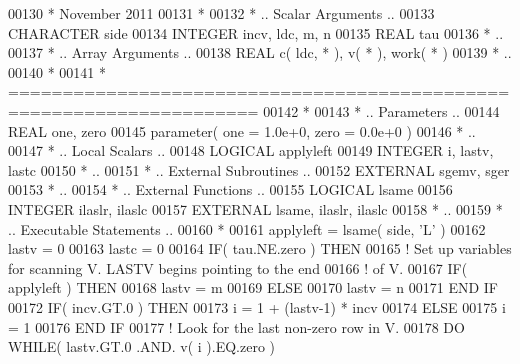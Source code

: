 \begin{DoxyCode}
00130 \textcolor{comment}{*     November 2011}
00131 \textcolor{comment}{*}
00132 \textcolor{comment}{*     .. Scalar Arguments ..}
00133       \textcolor{keywordtype}{CHARACTER}          side
00134       \textcolor{keywordtype}{INTEGER}            incv, ldc, m, n
00135       \textcolor{keywordtype}{REAL}               tau
00136 \textcolor{comment}{*     ..}
00137 \textcolor{comment}{*     .. Array Arguments ..}
00138       \textcolor{keywordtype}{REAL}               c( ldc, * ), v( * ), work( * )
00139 \textcolor{comment}{*     ..}
00140 \textcolor{comment}{*}
00141 \textcolor{comment}{*  =====================================================================}
00142 \textcolor{comment}{*}
00143 \textcolor{comment}{*     .. Parameters ..}
00144       \textcolor{keywordtype}{REAL}               one, zero
00145       parameter( one = 1.0e+0, zero = 0.0e+0 )
00146 \textcolor{comment}{*     ..}
00147 \textcolor{comment}{*     .. Local Scalars ..}
00148       \textcolor{keywordtype}{LOGICAL}            applyleft
00149       \textcolor{keywordtype}{INTEGER}            i, lastv, lastc
00150 \textcolor{comment}{*     ..}
00151 \textcolor{comment}{*     .. External Subroutines ..}
00152       \textcolor{keywordtype}{EXTERNAL}           sgemv, sger
00153 \textcolor{comment}{*     ..}
00154 \textcolor{comment}{*     .. External Functions ..}
00155       \textcolor{keywordtype}{LOGICAL}            lsame
00156       \textcolor{keywordtype}{INTEGER}            ilaslr, ilaslc
00157       \textcolor{keywordtype}{EXTERNAL}           lsame, ilaslr, ilaslc
00158 \textcolor{comment}{*     ..}
00159 \textcolor{comment}{*     .. Executable Statements ..}
00160 \textcolor{comment}{*}
00161       applyleft = lsame( side, \textcolor{stringliteral}{'L'} )
00162       lastv = 0
00163       lastc = 0
00164       \textcolor{keywordflow}{IF}( tau.NE.zero ) \textcolor{keywordflow}{THEN}
00165 \textcolor{comment}{!     Set up variables for scanning V.  LASTV begins pointing to the end}
00166 \textcolor{comment}{!     of V.}
00167          \textcolor{keywordflow}{IF}( applyleft ) \textcolor{keywordflow}{THEN}
00168             lastv = m
00169          \textcolor{keywordflow}{ELSE}
00170             lastv = n
00171 \textcolor{keywordflow}{         END IF}
00172          \textcolor{keywordflow}{IF}( incv.GT.0 ) \textcolor{keywordflow}{THEN}
00173             i = 1 + (lastv-1) * incv
00174          \textcolor{keywordflow}{ELSE}
00175             i = 1
00176 \textcolor{keywordflow}{         END IF}
00177 \textcolor{comment}{!     Look for the last non-zero row in V.}
00178          \textcolor{keywordflow}{DO} \textcolor{keywordflow}{WHILE}( lastv.GT.0 .AND. v( i ).EQ.zero )

\end{DoxyCode}
